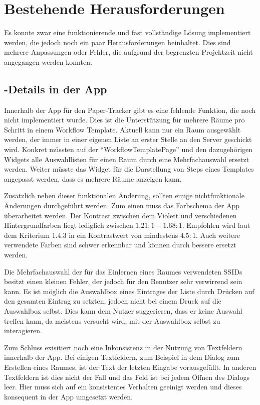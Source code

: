 \section{Bestehende Herausforderungen}

Es konnte zwar eine funktionierende und fast vollständige Lösung implementiert werden, die jedoch noch ein paar
Herausforderungen beinhaltet.
Dies sind mehrere Anpassungen oder Fehler, die aufgrund der begrenzten Projektzeit nicht angegangen werden konnten.

\subsection{-Details in der App}

Innerhalb der App für den Paper-Tracker gibt es eine fehlende Funktion, die noch nicht implementiert wurde.
Dies ist die Unterstützung für mehrere Räume pro Schritt in einem Workflow Template.
Aktuell kann nur ein Raum ausgewählt werden, der immer in einer eigenen Liste an erster Stelle an den Server geschickt wird.
Konkret müssten auf der \enquote{WorkflowTemplatePage} und den dazugehörigen Widgets alle Auswahllisten für einen Raum durch
eine Mehrfachauswahl ersetzt werden.
Weiter müsste das Widget für die Darstellung von Steps eines Templates angepasst werden, dass es mehrere Räume anzeigen kann.

Zusätzlich neben dieser funktionalen Änderung, sollten einige nichtfunktionale Änderungen durchgeführt werden.
Zum einen muss das Farbschema der App überarbeitet werden.
Der Kontrast zwischen dem Violett und verschiedenen Hintergrundfarben liegt lediglich zwischen $1.21:1 - 1.68:1$.
Empfohlen wird laut dem Kriterium 1.4.3 in \cite{W3C2018} ein Kontrastwert von mindestens $4.5:1$.
Auch weitere verwendete Farben sind schwer erkennbar und können durch bessere ersetzt werden.

Die Mehrfachauswahl der für das Einlernen eines Raumes verwendeten \gls{SSID}s besitzt einen kleinen Fehler, der jedoch
für den Benutzer sehr verwirrend sein kann.
Es ist möglich die Auswahlbox eines Eintrages der Liste durch Drücken auf den gesamten Eintrag zu setzten, jedoch nicht
bei einem Druck auf die Auswahlbox selbst.
Dies kann dem Nutzer suggerieren, dass er keine Auswahl treffen kann, da meistens versucht wird, mit der Auswahlbox selbst
zu interagieren.

Zum Schluss exisitiert noch eine Inkonsistenz in der Nutzung von Textfeldern innerhalb der App.
Bei einigen Textfeldern, zum Beispiel in dem Dialog zum Erstellen eines Raumes, ist der Text der letzten Eingabe vorausgefüllt.
In anderen Textfeldern ist dies nicht der Fall und das Feld ist bei jedem Öffnen des Dialogs leer.
Hier muss sich auf ein konsistentes Verhalten geeinigt werden und dieses konsequent in der App umgesetzt werden.

